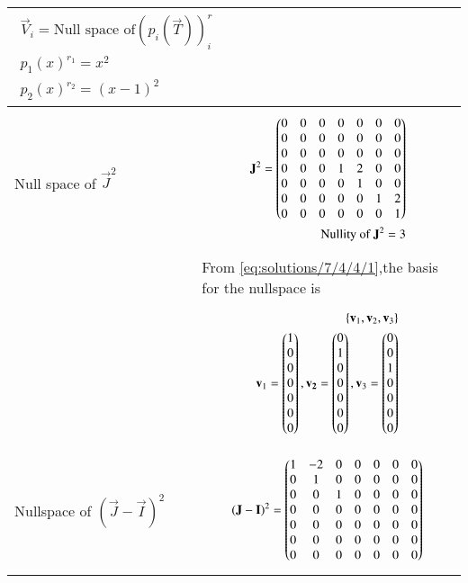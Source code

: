 \begin{longtable}{|p{5cm}|p{13cm}|}
{\begin{align}
      \vec{V}_i=\text{Null space of} (p_i(\vec{T}))^r_i\\
      {p_{1} (x)}^{r_{1}}=x^2\\
      {p_{2} (x)}^{r_{2}}=(x-1)^2
\end{align}}\\
\hline
 Null space of $\vec{J}^2$&
 \parbox{12cm}{\begin{align}
   \mathbf{J}^2=\begin{pmatrix}0&0&0&0&0&0&0\\0&0&0&0&0&0&0\\0&0&0&0&0&0&0\\0&0&0&1&2&0&0\\0&0&0&0&1&0&0\\0&0&0&0&0&1&2\\0&0&0&0&0&0&1\end{pmatrix}\label{eq:solutions/7/4/4/1}\\
   \text{Nullity of } \mathbf{J}^2=3
\end{align}}\\
& From \eqref{eq:solutions/7/4/4/1},the basis for the nullspace is\\
& \parbox{12cm}{\begin{align}
  \left\{\mathbf{v}_1,\mathbf{v}_2,\mathbf{v}_3\right\}\\
    \mathbf{v}_1=\begin{pmatrix}1\\0\\0\\0\\0\\0\\0\end{pmatrix},\mathbf{v_2}=\begin{pmatrix}0\\1\\0\\0\\0\\0\\0\end{pmatrix},\mathbf{v}_3=\begin{pmatrix}0\\0\\1\\0\\0\\0\\0\end{pmatrix}
\end{align}} \\
\hline
Nullspace of $(\vec{J}-\vec{I})^2$ &
\parbox{12cm}{\begin{align}
   (\vec{J}-\vec{I})^2=\myvec{1&-2&0&0&0&0&0\\0&1&0&0&0&0&0\\0&0&1&0&0&0&0\\0&0&0&0&0&0&0\\0&0&0&0&0&0&0\\0&0&0&0&0&0&0\\0&0&0&0&0&0&0}  \label{eq:solutions/7/4/4/2}\\

\end{align}}
\end{longtable}
